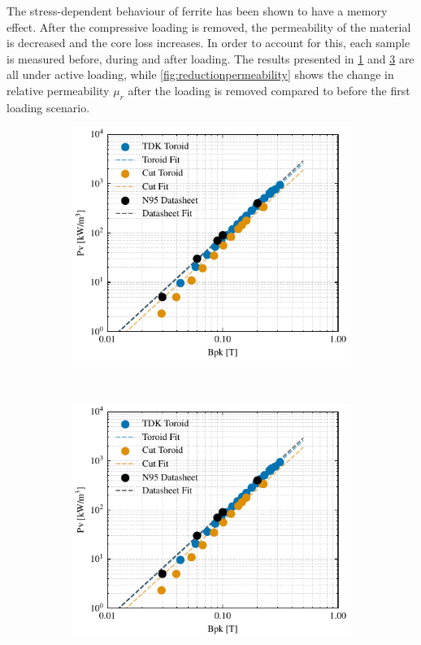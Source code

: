 \documentclass[conference]{IEEEtran}
\begin{document}
The stress-dependent behaviour of ferrite has been shown to have a memory effect. 
After the compressive loading is removed, the permeability of the material is decreased and the core loss increases. 
In order to account for this, each sample is measured before, during and after loading. 
The results presented in \cref{fig:BPcurves} and \cref{fig:corelossstress} are all under active loading, while \cref{fig:reductionpermeability} shows the change in relative permeability $\mu_r$ after the loading is removed compared to before the first loading scenario. 

\begin{figure}[t]
  \centering
  \begin{subfigure}{\columnwidth}
    \centering
    \includegraphics{figures/24-09-10_BP_curves.pdf}
    \caption{}
    \label{fig:BPcurves}
  \end{subfigure}~
  \begin{subfigure}{\columnwidth}
    \centering
    \includegraphics{figures/24-09-10_BP_curves.pdf}
    \caption{}
    \label{fig:corelossstress}
  \end{subfigure}


\end{figure}
\end{document}
